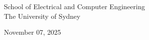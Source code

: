 \begin{titlepage}
\begin{flushleft}
\begin{center}
        \vspace{0.8cm}

        School of Electrical and Computer Engineering\\
        The University of Sydney

        \vspace{0.8cm}
        
        November 07, 2025 
        
        \vspace{2cm}
        
        \end{center}
        
    \end{flushleft}

\end{titlepage}